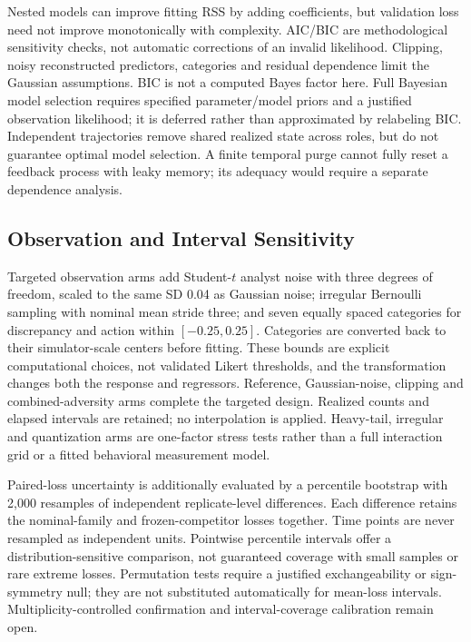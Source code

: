 Nested models can improve fitting RSS by adding coefficients, but validation loss need not improve monotonically with complexity. AIC/BIC are methodological sensitivity checks, not automatic corrections of an invalid likelihood. Clipping, noisy reconstructed predictors, categories and residual dependence limit the Gaussian assumptions. BIC is not a computed Bayes factor here. Full Bayesian model selection requires specified parameter/model priors and a justified observation likelihood; it is deferred rather than approximated by relabeling BIC. Independent trajectories remove shared realized state across roles, but do not guarantee optimal model selection. A finite temporal purge cannot fully reset a feedback process with leaky memory; its adequacy would require a separate dependence analysis.

\subsection{Observation and Interval Sensitivity}

Targeted observation arms add Student-$t$ analyst noise with three degrees of freedom, scaled to the same SD 0.04 as Gaussian noise; irregular Bernoulli sampling with nominal mean stride three; and seven equally spaced categories for discrepancy and action within $[-0.25,0.25]$. Categories are converted back to their simulator-scale centers before fitting. These bounds are explicit computational choices, not validated Likert thresholds, and the transformation changes both the response and regressors. Reference, Gaussian-noise, clipping and combined-adversity arms complete the targeted design. Realized counts and elapsed intervals are retained; no interpolation is applied. Heavy-tail, irregular and quantization arms are one-factor stress tests rather than a full interaction grid or a fitted behavioral measurement model.

Paired-loss uncertainty is additionally evaluated by a percentile bootstrap with 2,000 resamples of independent replicate-level differences. Each difference retains the nominal-family and frozen-competitor losses together. Time points are never resampled as independent units. Pointwise percentile intervals offer a distribution-sensitive comparison, not guaranteed coverage with small samples or rare extreme losses. Permutation tests require a justified exchangeability or sign-symmetry null; they are not substituted automatically for mean-loss intervals. Multiplicity-controlled confirmation and interval-coverage calibration remain open.

